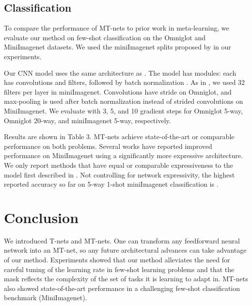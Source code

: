\documentclass{article}
\newcommand{\0}{{\bf 0}}
\begin{document}
\subsection{Classification }

To compare the performance of MT-nets to prior work in meta-learning, 
we evaluate our method on few-shot classification on the Omniglot \cite{Lake2015science} and MiniImagenet \cite{RaviS2017iclr} datasets.
We used the miniImagenet splits proposed by \cite{RaviS2017iclr} in our experiments.
\iffalse
The Omniglot dataset, sometimes referred to as the 'transpose of MNIST', consists of 1623 character classes from 50 different alphabets and has only 20 instances of each.
The MiniImagenet dataset is a subset of the full ImageNet dataset which has 100 different classes with 600 examples of each class.
\fi

Our CNN model uses the same architecture as \cite{FinnC2017icml}.
The model has  modules: each has  convolutions and  filters, followed by batch normalization \cite{Ioffe2015icml}.
As in \cite{FinnC2017icml}, we used 32 filters per layer in miniImagenet.
Convolutions have stride  on Omniglot, and  max-pooling is used after batch normalization
instead of strided convolutions on MiniImagenet.
We evaluate with 3, 5, and 10 gradient steps for Omniglot 5-way, Omniglot 20-way, and miniImagenet 5-way, respectively.

Results are shown in Table 3.
MT-nets achieve state-of-the-art or comparable performance on both problems.
Several works \cite{Mishra2018iclr,MunkhdalaiT2017icml,Sung2017arxiv} have reported improved performance on MiniImagenet using a significantly more expressive architecture.
We only report methods that have equal or comparable expressiveness to the model first described in \cite{VinyalsO2016nips}.
Not controlling for network expressivity, the highest reported accuracy so far on 5-way 1-shot miniImagenet classification is  \cite{Sung2017arxiv}.



\section{Conclusion}

We introduced T-nets and MT-nets.
One can transform any feedforward neural network into an MT-net, so any future architectural advances can take advantage of our method.
Experiments showed that our method alleviates the need for careful tuning of the learning rate in few-shot learning problems 
and that the mask  reflects the complexity of the set of tasks it is learning to adapt in.
MT-nets also showed state-of-the-art performance in a challenging few-shot classification benchmark (MiniImagenet).
\end{document}
